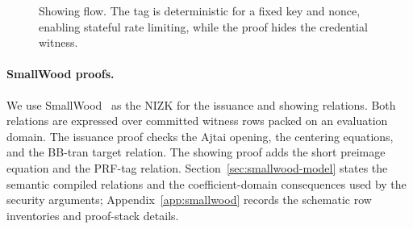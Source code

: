 \begin{figure}[h]
  \centering
  \caption{Showing flow.  The tag is deterministic for a fixed key and nonce, enabling stateful rate limiting, while the proof hides the credential witness.}
  \label{fig:showing-flow}
\end{figure}

\paragraph*{SmallWood proofs.}
We use SmallWood~\cite{EPRINT:FenRiv25b} as the NIZK for the issuance and showing relations.  Both
relations are expressed over committed witness rows packed on an evaluation domain.  The issuance proof
checks the Ajtai opening, the centering equations, and the BB-tran target relation.  The showing proof adds
the short preimage equation and the PRF-tag relation.  Section~\ref{sec:smallwood-model} states the
semantic compiled relations and the coefficient-domain consequences used by the security arguments;
Appendix~\ref{app:smallwood} records the schematic row inventories and proof-stack details.
